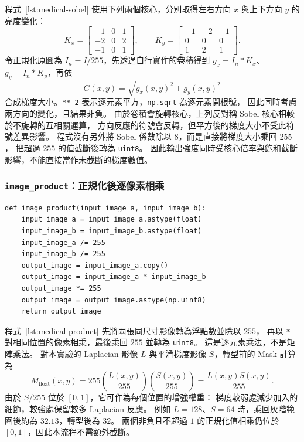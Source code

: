 程式~\ref{lst:medical-sobel} 使用下列兩個核心，分別取得左右方向 $x$ 與上下方向 $y$ 的亮度變化：
\begin{equation}
  K_x=
  \begin{bmatrix}
    -1&0&1\\
    -2&0&2\\
    -1&0&1
  \end{bmatrix},
  \qquad
  K_y=
  \begin{bmatrix}
    -1&-2&-1\\
     0& 0& 0\\
     1& 2& 1
  \end{bmatrix}.
  \label{eq:medical-sobel-kernels}
\end{equation}
令正規化原圖為 $I_n=I/255$，先透過自行實作的卷積得到
$g_x=I_n*K_x$、$g_y=I_n*K_y$，再依
\begin{equation}
  G(x,y)=\sqrt{g_x(x,y)^2+g_y(x,y)^2}
  \label{eq:medical-gradient-magnitude}
\end{equation}
合成梯度大小。\texttt{** 2} 表示逐元素平方，\texttt{np.sqrt} 為逐元素開根號，
因此同時考慮兩方向的變化，且結果非負。
由於卷積會旋轉核心，上列反對稱 Sobel 核心相較於不旋轉的互相關運算，
方向反應的符號會反轉，但平方後的梯度大小不受此符號差異影響。
程式沒有另外將 Sobel 係數除以 $8$，而是直接將梯度大小乘回 $255$，
把超過 $255$ 的值截斷後轉為 \texttt{uint8}。
因此輸出強度同時受核心倍率與飽和截斷影響，不能直接當作未截斷的梯度數值。

\subsubsection{\textnormal{\texttt{image\_product}}：正規化後逐像素相乘}

\noindent\begin{minipage}{\linewidth}
\begin{lstlisting}[caption={將平滑梯度作為 Laplacian 細節的逐像素權重},label={lst:medical-product}]
def image_product(input_image_a, input_image_b):
    input_image_a = input_image_a.astype(float)
    input_image_b = input_image_b.astype(float)
    input_image_a /= 255
    input_image_b /= 255
    output_image = input_image_a.copy()
    output_image = input_image_a * input_image_b
    output_image *= 255
    output_image = output_image.astype(np.uint8)
    return output_image
\end{lstlisting}
\end{minipage}\par

程式~\ref{lst:medical-product} 先將兩張同尺寸影像轉為浮點數並除以 $255$，
再以 \texttt{*} 對相同位置的像素相乘，最後乘回 $255$ 並轉為 \texttt{uint8}。
這是逐元素乘法，不是矩陣乘法。
對本實驗的 Laplacian 影像 $L$ 與平滑梯度影像 $S$，轉型前的 Mask 計算為
\begin{equation}
  M_{\mathrm{float}}(x,y)
  =255\left(\frac{L(x,y)}{255}\right)
       \left(\frac{S(x,y)}{255}\right)
  =\frac{L(x,y)S(x,y)}{255}.
  \label{eq:medical-mask}
\end{equation}
由於 $S/255$ 位於 $[0,1]$，它可作為每個位置的增強權重：
梯度較弱處減少加入的細節，較強處保留較多 Laplacian 反應。
例如 $L=128$、$S=64$ 時，乘回灰階範圍後約為 $32.13$，轉型後為 $32$。
兩個非負且不超過 $1$ 的正規化值相乘仍位於 $[0,1]$，因此本流程不需額外截斷。

